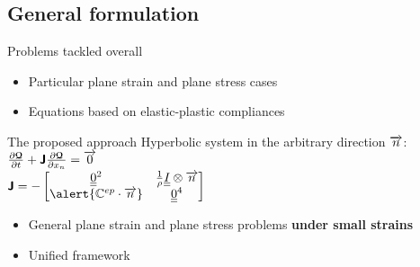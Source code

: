 \subsection{General formulation}
\begin{frame}
  \begin{block}{Problems tackled overall}
    \begin{itemize}
    \item Particular plane strain and plane stress cases \cite{Bleich,Ting69,Ting73,Li_planeStress_EP}
    \item Equations based on elastic-plastic compliances
    
    \end{itemize}
  \end{block}
  \begin{block}{The proposed approach}
    Hyperbolic system in the arbitrary direction ${\overrightarrow{n}}$: $\frac{\partial {\boldsymbol{\mathcal{Q}}}}{\partial t} + \boldsymbol{\mathsf{J}} \frac{\partial {\boldsymbol{\mathcal{Q}}}}{\partial x_n} ={\overrightarrow{0}}$ \\
    $\Jbsf=-\matrice{\tens{0}^2 & \frac{1}{\rho}\tens{I}\otimes\vect{n} \\ \alert{\Cbb^{ep}\cdot \vect{n}} & \tens{0}^4}$
    \begin{itemize}
    \item General plane strain and plane stress problems \textbf{under small strains}
    \item Unified framework
    \end{itemize}
  \end{block}
\end{frame}

